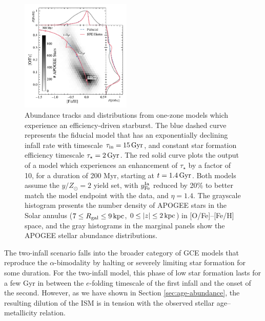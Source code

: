 \documentclass[twocolumn,twocolappendix,linenumbers]{aastex631}
\newcommand{\yZ}[1]{$y/Z_\odot=#1$}
\newcommand{\kpc}{\,{\rm kpc}}
\newcommand{\Gyr}{\,{\rm Gyr}}
\newcommand{\onecolumn}{0.47\textwidth}
\begin{document}
\begin{figure}
    \centering
    \includegraphics[width=\onecolumn]{figures/sfe_hiatus.pdf}
    \caption{Abundance tracks and distributions from one-zone models which experience an efficiency-driven starburst. The blue dashed curve represents the fiducial model that has an exponentially declining infall rate with timescale $\tau_{\rm in}=15\Gyr$, and constant star formation efficiency timescale $\tau_\star=2\,{\rm Gyr}$. The red solid curve plots the output of a model which experiences an enhancement of $\tau_\star$ by a factor of 10, for a duration of 200 Myr, starting at $t=1.4\,{\rm Gyr}$. Both models assume the \yZ{2} yield set, with $y_{\rm Fe}^{\rm Ia}$ reduced by 20\% to better match the model endpoint with the data, and $\eta=1.4$. The grayscale histogram presents the number density of APOGEE stars in the Solar annulus ($7\leq R_{\rm gal}\leq 9\kpc$, $0\leq|z|\leq2\kpc$) in [O/Fe]--[Fe/H] space, and the gray histograms in the marginal panels show the APOGEE stellar abundance distributions.}
    \label{fig:onezone-sfe-hiatus}
\end{figure}

The two-infall scenario falls into the broader category of GCE models that reproduce the $\alpha$-bimodality by halting or severely limiting star formation for some duration. For the two-infall model, this phase of low star formation lasts for a few Gyr in between the $e$-folding timescale of the first infall and the onset of the second. However, as we have shown in Section \ref{sec:age-abundance}, the resulting dilution of the ISM is in tension with the observed stellar age--metallicity relation.
\end{document}
